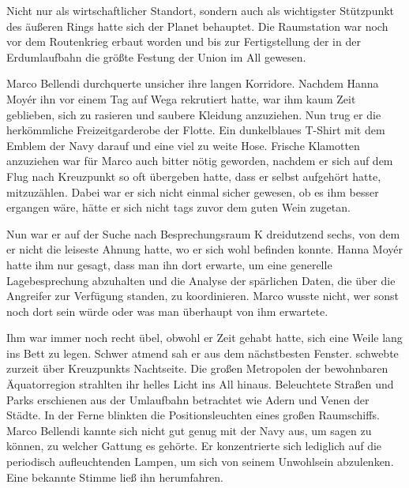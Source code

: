 \par

Nicht nur als wirtschaftlicher Standort, sondern auch als wichtigster Stützpunkt des äußeren Rings hatte sich der Planet behauptet. Die Raumstation  war noch vor dem Routenkrieg erbaut worden und bis zur Fertigstellung der  in der Erdumlaufbahn die größte Festung der Union im All gewesen.

\par

Marco Bellendi durchquerte unsicher ihre langen Korridore. Nachdem Hanna Moyér ihn vor einem Tag auf Wega rekrutiert hatte, war ihm kaum Zeit geblieben, sich zu rasieren und saubere Kleidung anzuziehen. Nun trug er die herkömmliche Freizeitgarderobe der Flotte. Ein dunkelblaues T-Shirt mit dem Emblem der Navy darauf und eine viel zu weite Hose. Frische Klamotten anzuziehen war für Marco auch bitter nötig geworden, nachdem er sich auf dem Flug nach Kreuzpunkt so oft übergeben hatte, dass er selbst aufgehört hatte, mitzuzählen. Dabei war er sich nicht einmal sicher gewesen, ob es ihm besser ergangen wäre, hätte er sich nicht tags zuvor dem guten Wein zugetan.

\par

Nun war er auf der Suche nach Besprechungsraum K dreidutzend sechs, von dem er nicht die leiseste Ahnung hatte, wo er sich wohl befinden konnte. Hanna Moyér hatte ihm nur gesagt, dass man ihn dort erwarte, um eine generelle Lagebesprechung abzuhalten und die Analyse der spärlichen Daten, die über die Angreifer zur Verfügung standen, zu koordinieren. Marco wusste nicht, wer sonst noch dort sein würde oder was man überhaupt von ihm erwartete.

\par

Ihm war immer noch recht übel, obwohl er Zeit gehabt hatte, sich eine Weile lang ins Bett zu legen. Schwer atmend sah er aus dem nächstbesten Fenster.  schwebte zurzeit über Kreuzpunkts Nachtseite. Die großen Metropolen der bewohnbaren Äquatorregion strahlten ihr helles Licht ins All hinaus. Beleuchtete Straßen und Parks erschienen aus der Umlaufbahn betrachtet wie Adern und Venen der Städte. In der Ferne blinkten die Positionsleuchten eines großen Raumschiffs. Marco Bellendi kannte sich nicht gut genug mit der Navy aus, um sagen zu können, zu welcher Gattung es gehörte. Er konzentrierte sich lediglich auf die periodisch aufleuchtenden Lampen, um sich von seinem Unwohlsein abzulenken. Eine bekannte Stimme ließ ihn herumfahren.

